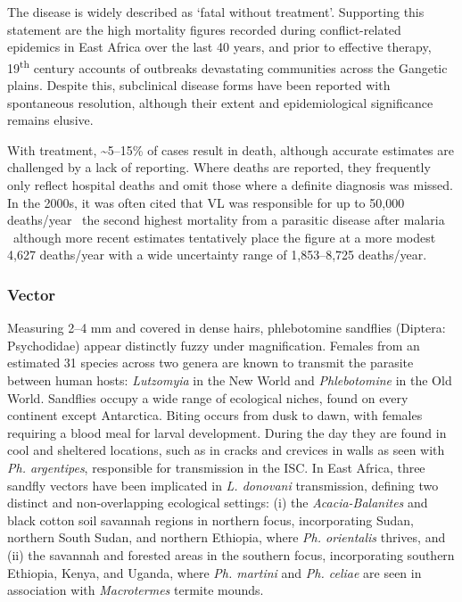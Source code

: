 The disease is widely described as `fatal without treatment'\cite{burza2018,farrar2023manson}. Supporting this statement are the high mortality figures recorded during conflict-related epidemics in East Africa over the last 40 years, and prior to effective therapy, 19\textsuperscript{th} century accounts of outbreaks devastating communities across the Gangetic plains\cite{collin2004, gibson1983,steverding2017}. Despite this, subclinical disease forms have been reported with spontaneous resolution, although their extent and epidemiological significance remains elusive\cite{mouri2015,badaro1986}.

With treatment, \textasciitilde5--15\% of cases result in death, although accurate estimates are challenged by a lack of reporting. Where deaths are reported, they frequently only reflect hospital deaths and omit those where a definite diagnosis was missed. In the 2000s, it was often cited that VL was responsible for up to 50,000 deaths/year \textemdash\  the second highest mortality from a parasitic disease after malaria\cite{chappuis2007} \textemdash\  although more recent estimates tentatively place the figure at a more modest 4,627 deaths/year with a wide uncertainty range of 1,853--8,725 deaths/year\cite{gbd2023}.

\subsubsection{Vector}
Measuring 2--4 mm and covered in dense hairs, phlebotomine sandflies (Diptera: Psychodidae) appear distinctly fuzzy under magnification. Females from an estimated 31 species across two genera are known to transmit the parasite between human hosts: \textit{Lutzomyia} in the New World and \textit{Phlebotomine} in the Old World\cite{akhoundi2016}. Sandflies occupy a wide range of ecological niches, found on every continent except Antarctica. Biting occurs from dusk to dawn, with females requiring a blood meal for larval development. During the day they are found in cool and sheltered locations, such as in cracks and crevices in walls as seen with \textit{Ph. argentipes}, responsible for transmission in the ISC. In East Africa, three sandfly vectors have been implicated in \textit{L. donovani} transmission, defining two distinct and non-overlapping ecological settings: (i) the \textit{Acacia-Balanites} and black cotton soil savannah regions in northern focus, incorporating Sudan, northern South Sudan, and northern Ethiopia, where \textit{Ph. orientalis} thrives, and (ii) the savannah and forested areas in the southern focus, incorporating southern Ethiopia, Kenya, and Uganda, where \textit{Ph. martini} and \textit{Ph. celiae} are seen in association with \textit{Macrotermes} termite mounds.

